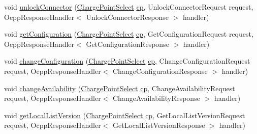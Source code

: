\begin{DoxyCompactItemize}
\item 
void \hyperlink{classde_1_1rwth_1_1idsg_1_1steve_1_1ocpp_1_1soap_1_1_charge_point_service15___soap_invoker_af29c600b4f55e5ab8538181528b97aa3}{unlock\-Connector} (\hyperlink{classde_1_1rwth_1_1idsg_1_1steve_1_1repository_1_1dto_1_1_charge_point_select}{Charge\-Point\-Select} \hyperlink{get_transaction_ids_8js_a02fb69feb56940fd46d72ea6a60e511f}{cp}, Unlock\-Connector\-Request request, Ocpp\-Response\-Handler$<$ Unlock\-Connector\-Response $>$ handler)
\item 
void \hyperlink{classde_1_1rwth_1_1idsg_1_1steve_1_1ocpp_1_1soap_1_1_charge_point_service15___soap_invoker_a006d420e0756623c68c01eb75fc32e8c}{get\-Configuration} (\hyperlink{classde_1_1rwth_1_1idsg_1_1steve_1_1repository_1_1dto_1_1_charge_point_select}{Charge\-Point\-Select} \hyperlink{get_transaction_ids_8js_a02fb69feb56940fd46d72ea6a60e511f}{cp}, Get\-Configuration\-Request request, Ocpp\-Response\-Handler$<$ Get\-Configuration\-Response $>$ handler)
\item 
void \hyperlink{classde_1_1rwth_1_1idsg_1_1steve_1_1ocpp_1_1soap_1_1_charge_point_service15___soap_invoker_a1da6ac781c9faf40e5f16d26d72fb0bf}{change\-Configuration} (\hyperlink{classde_1_1rwth_1_1idsg_1_1steve_1_1repository_1_1dto_1_1_charge_point_select}{Charge\-Point\-Select} \hyperlink{get_transaction_ids_8js_a02fb69feb56940fd46d72ea6a60e511f}{cp}, Change\-Configuration\-Request request, Ocpp\-Response\-Handler$<$ Change\-Configuration\-Response $>$ handler)
\item 
void \hyperlink{classde_1_1rwth_1_1idsg_1_1steve_1_1ocpp_1_1soap_1_1_charge_point_service15___soap_invoker_a8e5d3a5c9a04e9774cbf8b9bf3d81e6f}{change\-Availability} (\hyperlink{classde_1_1rwth_1_1idsg_1_1steve_1_1repository_1_1dto_1_1_charge_point_select}{Charge\-Point\-Select} \hyperlink{get_transaction_ids_8js_a02fb69feb56940fd46d72ea6a60e511f}{cp}, Change\-Availability\-Request request, Ocpp\-Response\-Handler$<$ Change\-Availability\-Response $>$ handler)
\item 
void \hyperlink{classde_1_1rwth_1_1idsg_1_1steve_1_1ocpp_1_1soap_1_1_charge_point_service15___soap_invoker_a73f9493312a541bc4d7ecb667eee2e11}{get\-Local\-List\-Version} (\hyperlink{classde_1_1rwth_1_1idsg_1_1steve_1_1repository_1_1dto_1_1_charge_point_select}{Charge\-Point\-Select} \hyperlink{get_transaction_ids_8js_a02fb69feb56940fd46d72ea6a60e511f}{cp}, Get\-Local\-List\-Version\-Request request, Ocpp\-Response\-Handler$<$ Get\-Local\-List\-Version\-Response $>$ handler)
\item 

\end{DoxyCompactItemize}
